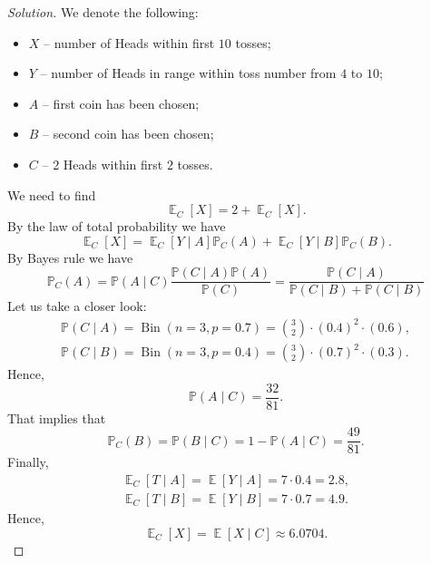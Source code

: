 \documentclass{article}[12pt]
\newenvironment{solution}
  {\renewcommand\qedsymbol{$\blacksquare$}\begin{proof}[Solution]}
  {\end{proof}}
\DeclareMathOperator{\Bin}{Bin}
\DeclareMathOperator{\E}{\mathbb{E}}
\renewcommand{\P}{\mathbb{P}}
\begin{document}
\begin{solution}
We denote the following:
\begin{itemize}
    \item $X$ -- number of Heads within first $10$ tosses;
    \item $Y$ -- number of Heads in range within toss number from $4$ to $10$;
    \item $A$ -- first coin has been chosen;
    \item $B$ -- second coin has been chosen;
    \item $C$ -- 2 Heads within first $2$ tosses.
\end{itemize}
We need to find
\begin{equation*}
    \E_{C}[X] = 2 + \E_{C}[X].
\end{equation*}
By the law of total probability we have
\begin{equation*}
    \E_{C}[X] = \E_{C}[Y\mid A]\P_{C}(A) +  \E_{C}[Y\mid B]\P_{C}(B).
\end{equation*}
By Bayes rule we have
\begin{equation*}
    \P_{C}(A) = \P(A\mid C)\frac{\P(C\mid A)\P(A)}{\P(C)} = \frac{\P(C\mid A)}{\P(C\mid B) + \P(C\mid B)}
\end{equation*}
Let us take a closer look:
\begin{gather*}
    \P(C\mid A) = \Bin(n = 3, p = 0.7) = \binom{3}{2}\cdot(0.4)^{2}\cdot(0.6),
    \\
    \P(C\mid B) = \Bin(n = 3, p = 0.4) = \binom{3}{2}\cdot(0.7)^{2}\cdot(0.3).
\end{gather*}
Hence,
\begin{equation*}
    \P(A\mid C) = \frac{32}{81}.
\end{equation*}
That implies that
\begin{equation*}
    \P_{C}(B) = \P(B\mid C) = 1 - \P(A\mid C) = \frac{49}{81}.
\end{equation*}
Finally,
\begin{gather*}
    \E_{C}[T\mid A] = \E[Y\mid A] = 7\cdot 0.4 = 2.8,
    \\
    \E_{C}[T\mid B] = \E[Y\mid B] = 7\cdot 0.7 = 4.9.
\end{gather*}
Hence,
\begin{equation*}
    \E_{C}[X] = \E[X\mid C] \approx 6.0704.
\end{equation*}
\end{solution}
\end{document}

